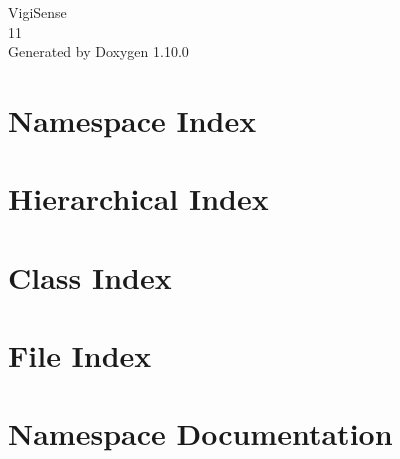 \documentclass[twoside]{book}
\newcommand{\+}{\discretionary{\mbox{\scriptsize$\hookleftarrow$}}{}{}}
\newcommand{\clearemptydoublepage}{%
    \newpage{\pagestyle{empty}\cleardoublepage}%
  }
\begin{document}
  \raggedbottom
    \hypersetup{pageanchor=false,
                bookmarksnumbered=true,
                pdfencoding=unicode
               }
  \begin{titlepage}
  \vspace*{7cm}
  \begin{center}%
  {\Large Vigi\+Sense}\\
  [1ex]\large 11 \\
  \vspace*{1cm}
  {\large Generated by Doxygen 1.10.0}\\
  \end{center}
  \end{titlepage}
  \clearemptydoublepage
  \tableofcontents
  \clearemptydoublepage
  \hypersetup{pageanchor=true}
\chapter{Namespace Index}

\chapter{Hierarchical Index}

\chapter{Class Index}

\chapter{File Index}

\chapter{Namespace Documentation}



\end{document}
